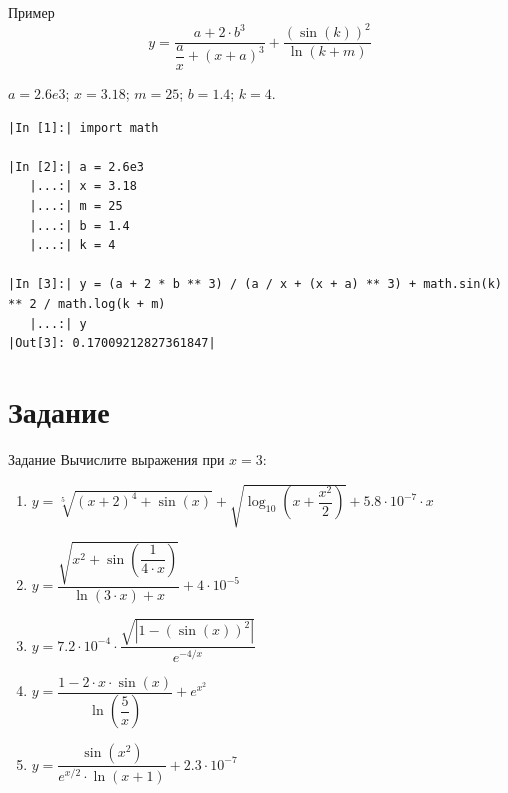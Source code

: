 \documentclass[aspectratio=169]{beamer}	%
\begin{document}
\begin{frame}[fragile]{Пример}
\scriptsize
\begin{equation*}
	y = \dfrac{a + 2 \cdot b ^ 3}{\dfrac{a}{x} + \left(x + a\right)^3} + \dfrac{\left(\sin\left(k\right)\right)^2}{\ln \left(k + m\right)}
\end{equation*}
\begin{center}
	$a = 2.6e3$; \quad $x = 3.18$; \quad $m = 25$; \quad $b = 1.4$; \quad $k = 4$.
\end{center}
\begin{verbatim}
|In [1]:| import math

|In [2]:| a = 2.6e3
   |...:| x = 3.18
   |...:| m = 25
   |...:| b = 1.4
   |...:| k = 4

|In [3]:| y = (a + 2 * b ** 3) / (a / x + (x + a) ** 3) + math.sin(k) ** 2 / math.log(k + m)
   |...:| y
|Out[3]: 0.17009212827361847|
\end{verbatim}
\vfill
\end{frame}

\section{Задание}
\sectionframe


\begin{frame}[fragile]{Задание}
\footnotesize	
Вычислите выражения при $x = 3$:
\begin{enumerate}
	\item $y = \sqrt[5]{\left(x + 2\right)^4 + \sin \left(x\right)} + \sqrt{\log _{10}\left(x + \dfrac{x^2}{2}\right)} + 5.8 \cdot 10^{-7} \cdot x$
	
	\item $y = \dfrac{\sqrt{x^2 + \sin \left(\dfrac{1}{4 \cdot x}\right)}}{\ln \left(3 \cdot x\right) + x} + 4 \cdot 10^{-5}$
	
	\item $y = 7.2 \cdot 10^{-4} \cdot \dfrac{\sqrt{\left|1 - \left(\sin \left(x\right)\right)^2\right|}}{e^{-{4}/{x}}}$
	
	\item $y = \dfrac{1 - 2 \cdot x \cdot \sin \left(x\right)}{\ln \left(\dfrac{5}{x}\right)} + e^{x^2}$
	
	\item $y = \dfrac{\sin \left(x^2\right)}{e^{{x}/{2}} \cdot \ln \left(x + 1\right)} + 2.3 \cdot 10^{-7}$
	
\end{enumerate}

\vfill
\end{frame}
\end{document}
